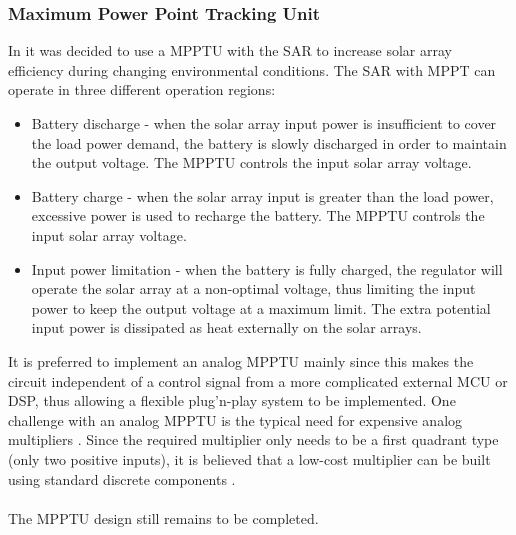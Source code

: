 \subsubsection{Maximum Power Point Tracking Unit}
\label{sec:MPPTU}
In \cite{PDR} it was decided to use a \ac{MPPTU} with the \ac{SAR} to increase solar array efficiency during changing environmental conditions. The \ac{SAR} with \ac{MPPT} can operate in three different operation regions:
%
\begin{itemize}
\item Battery discharge - when the solar array input power is insufficient to cover the load power demand, the battery is slowly discharged in order to maintain the output voltage. The \ac{MPPTU} controls the input solar array voltage.
\item Battery charge - when the solar array input is greater than the load power, excessive power is used to recharge the battery. The \ac{MPPTU} controls the input solar array voltage.
\item Input power limitation - when the battery is fully charged, the regulator will operate the solar array at a non-optimal voltage, thus limiting the input power to keep the output voltage at a maximum limit. The extra potential input power is dissipated as heat externally on the solar arrays.
\end{itemize}
%
It is preferred to implement an analog \ac{MPPTU} mainly since this makes the circuit independent of a control signal from a more complicated external \ac{MCU} or \ac{DSP}, thus allowing a flexible plug'n-play system to be implemented. One challenge with an analog \ac{MPPTU} is the typical need for expensive analog multipliers \cite{Liang}. Since the required multiplier only needs to be a first quadrant type (only two positive inputs), it is believed that a low-cost multiplier can be built using standard discrete components \cite{Multiplier}.
%
\\
\\
The \ac{MPPTU} design still remains to be completed.
%
%
